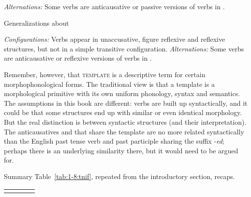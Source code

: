 \begin{exe}
\begin{xlist}
\begin{xlist}
\begin{exe}
\begin{xlist}
\begin{xlist}
\begin{exe}
\begin{xlist}
\begin{xlist}
\begin{exe}
\begin{exe}
\begin{xlist}
\begin{exe}
\begin{exe}
\begin{xlist}
\begin{exe}
\begin{exe}
\begin{exe}
\begin{exe}
\begin{exe}
\begin{xlist}
\begin{exe}
\begin{xlist}
\begin{exe}
\begin{exe}
\begin{xlist}
\begin{exe}
\begin{xlist}
\begin{exe}
\begin{xlist}
\begin{exe}
\begin{exe}
\begin{exe}
\begin{xlist}
\begin{exe}
\begin{exe}
\begin{exe}
\begin{xlist}
\begin{exe}
\begin{xlist}
\begin{exe}
\begin{xlist}
\begin{exe}
\begin{xlist}
\begin{exe}
\begin{exe}
\begin{exe}
\begin{exe}
\begin{xlist}
\begin{exe}
\begin{xlist}
\begin{exe}
\begin{xlist}
\begin{exe}
\begin{xlist}
\begin{exe}
\begin{xlist}
\begin{exe}
\begin{xlist}
\begin{exe}
\begin{exe}
\begin{exe}
\begin{exe}
\begin{xlist}
\begin{exe}
\begin{xlist}
\begin{exe}
\begin{xlist}
\begin{exe}
\begin{exe}
\begin{xlist}
\begin{exe}
\begin{xlist}
\begin{exe}
\begin{exe}
\begin{exe}
\begin{exe}
\begin{xlist}
\begin{xlist}
\begin{exe}
\begin{xlist}
\begin{exe}
\begin{exe}
\begin{exe}
\begin{xlist}
\begin{exe}
\begin{exe}
\begin{xlist}
\begin{exe}
\begin{exe}
\begin{exe}
\begin{xlist}
\begin{xlist}
\begin{exe}
\begin{xlist}
\begin{exe}
\begin{exe}
\begin{exe}
\begin{exe}
\begin{xlist}
\begin{exe}
\begin{xlist}
\begin{exe}
\begin{xlist}
\begin{exe}
\begin{xlist}
\begin{exe}
\begin{exe}
\begin{exe}
\begin{exe}
\begin{exe}
\begin{exe}
\begin{xlist}
\begin{exe}
\begin{xlist}
\begin{exe}
\begin{xlist}
\begin{exe}
\begin{xlist}
\textit{Alternations:} Some verbs are anticausative or passive versions of verbs in {\tkal}. 
 \z
\z 

 \begin{exe}
 \ex  \label{ex:gen-thit-sum}Generalizations about {\thit}
 \begin{xlist} 
 	\ex  \textit{Configurations:} Verbs appear in unaccusative, figure reflexive and reflexive structures, but not in a simple transitive configuration. 
 	\ex  \textit{Alternations:} Some verbs are anticausative or reflexive versions of verbs in {\tpie}. 
 \z
\z 

Remember, however, that \textsc{template} is a descriptive term for certain morphophonological forms. The traditional view is that a template is a morphological primitive with its own uniform phonology, syntax and semantics. The assumptions in this book are different: verbs are built up syntactically, and it could be that some structures end up with similar or even identical morphology. But the real distinction is between syntactic structures (and their interpretation). The anticausatives and  that share the template {\tnif} are no more related syntactically than the English past tense verb and past participle sharing the suffix -\emph{ed}; perhaps there is an underlying similarity there, but it would need to be argued for.

Summary Table~\ref{tab:1-8:tnif}, repeated from the introductory section, recaps.

\begin{table}
	\begin{tabular}{llcc} 
		\lsptoprule
		\multicolumn{2}{c}{Construction}	& {\tnif}	& 
\end{tabular}
\end{table}
\end{xlist}
\end{exe}
\end{xlist}
\end{exe}
\end{xlist}
\end{exe}
\end{xlist}
\end{exe}
\end{xlist}
\end{exe}
\end{exe}
\end{exe}
\end{exe}
\end{exe}
\end{exe}
\end{xlist}
\end{exe}
\end{xlist}
\end{exe}
\end{xlist}
\end{exe}
\end{xlist}
\end{exe}
\end{exe}
\end{exe}
\end{exe}
\end{xlist}
\end{exe}
\end{xlist}
\end{xlist}
\end{exe}
\end{exe}
\end{exe}
\end{xlist}
\end{exe}
\end{exe}
\end{xlist}
\end{exe}
\end{exe}
\end{exe}
\end{xlist}
\end{exe}
\end{xlist}
\end{xlist}
\end{exe}
\end{exe}
\end{exe}
\end{exe}
\end{xlist}
\end{exe}
\end{xlist}
\end{exe}
\end{exe}
\end{xlist}
\end{exe}
\end{xlist}
\end{exe}
\end{xlist}
\end{exe}
\end{exe}
\end{exe}
\end{exe}
\end{xlist}
\end{exe}
\end{xlist}
\end{exe}
\end{xlist}
\end{exe}
\end{xlist}
\end{exe}
\end{xlist}
\end{exe}
\end{xlist}
\end{exe}
\end{exe}
\end{exe}
\end{exe}
\end{xlist}
\end{exe}
\end{xlist}
\end{exe}
\end{xlist}
\end{exe}
\end{xlist}
\end{exe}
\end{exe}
\end{exe}
\end{xlist}
\end{exe}
\end{exe}
\end{exe}
\end{xlist}
\end{exe}
\end{xlist}
\end{exe}
\end{xlist}
\end{exe}
\end{exe}
\end{xlist}
\end{exe}
\end{xlist}
\end{exe}
\end{exe}
\end{exe}
\end{exe}
\end{exe}
\end{xlist}
\end{exe}
\end{exe}
\end{xlist}
\end{exe}
\end{exe}
\end{xlist}
\end{xlist}
\end{exe}
\end{xlist}
\end{xlist}
\end{exe}
\end{xlist}
\end{xlist}
\end{exe}
